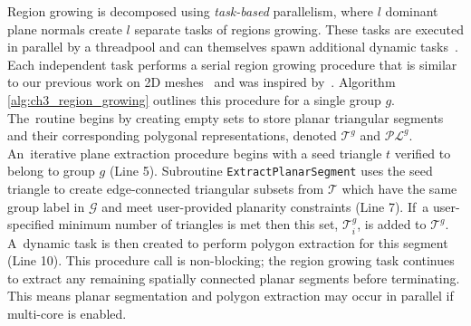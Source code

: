 Region growing is decomposed using \emph{task-based} parallelism, where $l$ dominant plane normals create $l$ separate tasks of regions growing. These tasks are executed in parallel by a threadpool and can themselves spawn additional dynamic tasks~\cite{huang_cpp-taskflow_2019}. Each independent task performs a serial region growing procedure that is similar to our previous work on 2D meshes~\cite{castagno_polylidar_2020} and was inspired by~\cite{cao_roof_2017}. Algorithm \ref{alg:ch3_region_growing} outlines this procedure for a single group $g$. The~routine begins by creating empty sets to store planar triangular segments and their corresponding polygonal representations, denoted $\mathcal{T}^g$ and $\mathcal{PL}^g$.  An~iterative plane extraction procedure begins with a seed triangle $t$  verified to belong to group $g$ (Line 5). Subroutine \texttt{ExtractPlanarSegment} uses the seed triangle to create edge-connected triangular subsets from $\mathcal{T}$ which have the same group label in $\mathcal{G}$ and meet user-provided planarity constraints (Line 7). If~a user-specified minimum number of triangles is met then this set, $\mathcal{T}^g_i$, is added to $\mathcal{T}^g$. A~dynamic task is then created to perform polygon extraction for this segment (Line 10). This procedure call is non-blocking; the region growing task continues to extract any remaining spatially connected planar segments before terminating. This means planar segmentation and polygon extraction may occur in parallel if multi-core is enabled.


\vspace{6pt}

